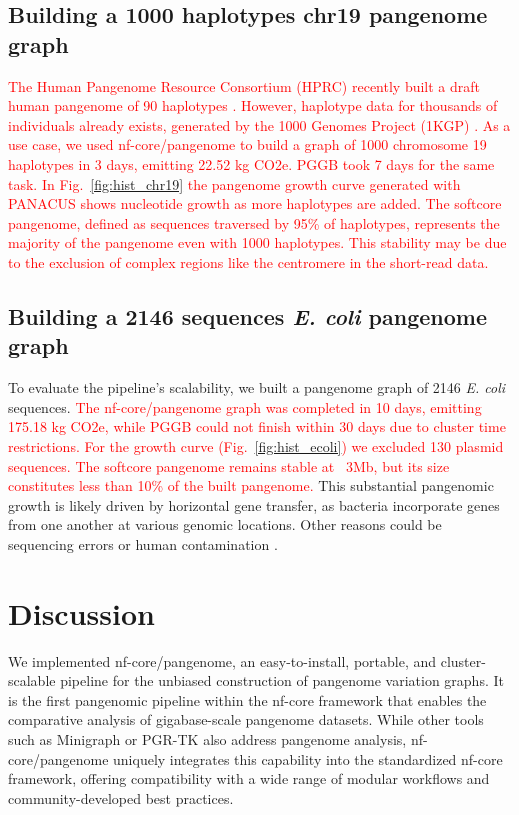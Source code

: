 \documentclass{bioinfo}
\theoremstyle{definition}
\newcommand{\red}[1]{{\textcolor{Red}{#1}}}
\begin{document}
	\subsection{Building a 1000 haplotypes chr19 pangenome graph}
	
	\red{The Human Pangenome Resource Consortium (HPRC) recently built a draft human pangenome of 90 haplotypes \citep{Liao2023}. 
	However, haplotype data for thousands of individuals already exists, generated by the 1000 Genomes Project (1KGP) \citep{Durbin2010}. 
	As a use case, we used nf-core/pangenome to build a graph of 1000 chromosome 19 haplotypes \citep{Kuhnle2020} in 3 days, emitting 22.52 kg CO2e.
	PGGB took 7 days for the same task. 
	In Fig.~\ref{fig:hist_chr19} the pangenome growth curve generated with PANACUS \citep{Liao2023} shows nucleotide growth as more haplotypes are added.}
	\red{The softcore pangenome, defined as sequences traversed by 95\% of haplotypes, represents the majority of the pangenome even with 1000 haplotypes. 
	This stability may be due to the exclusion of complex regions like the centromere in the short-read data.
	}

	
	\subsection{Building a 2146 sequences \textit{E. coli} pangenome graph}
	
	To evaluate the pipeline’s scalability, we built a pangenome graph of 2146 \textit{E. coli} sequences. 
\red{	The nf-core/pangenome graph was completed in 10 days, emitting 175.18 kg CO2e, while PGGB could not finish within 30 days due to cluster time restrictions.}
\red{	For the growth curve (Fig.~\ref{fig:hist_ecoli}) we excluded 130 plasmid sequences. 
	The softcore pangenome remains stable at ~3Mb, but its size constitutes less than 10\% of the built pangenome.}
	This substantial pangenomic growth is likely driven by horizontal gene transfer, as bacteria incorporate genes from one another at various genomic locations.
	Other reasons could be sequencing errors or human contamination \citep{Breitwieser2019}.

	\vspace{-0.5cm}
	\section{Discussion}
	
	We implemented nf-core/pangenome, an easy-to-install, portable, and cluster-scalable pipeline for the unbiased construction of pangenome variation graphs.  
    It is the first pangenomic pipeline within the nf-core framework that enables the comparative analysis of gigabase-scale pangenome datasets. 
    While other tools such as Minigraph \citep{Li_2020} or PGR-TK \citep{Chin2023} also address pangenome analysis, nf-core/pangenome uniquely integrates this capability into the standardized nf-core framework, offering compatibility with a wide range of modular workflows and community-developed best practices.
    
\end{document}
